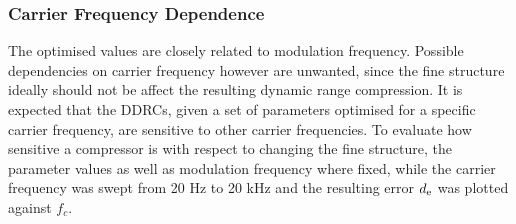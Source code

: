 \documentclass[../main2.tex]{subfiles}
\begin{document}
\subsubsection{Carrier Frequency Dependence}\label{method_carrier_freq_dep}
The optimised values are closely related to modulation frequency. Possible dependencies on carrier frequency however are unwanted, since the fine structure ideally should not be affect the resulting dynamic range compression. It is expected that the DDRCs, given a set of parameters optimised for a specific carrier frequency, are sensitive to other carrier frequencies. To evaluate how sensitive a compressor is with respect to changing the fine structure, the parameter values as well as modulation frequency where fixed, while the carrier frequency was swept from 20 Hz to 20 kHz and the resulting error $d_\text{e}$ was plotted against $f_c$.
\end{document}
